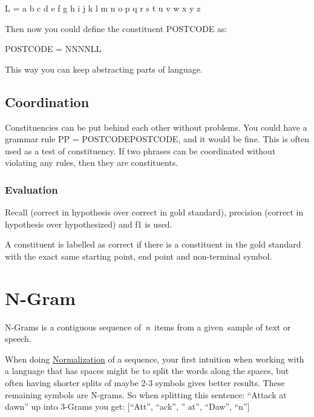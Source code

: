 \documentclass[
  11pt,
  british,
]{article}
\begin{document}
L = a \textbar{} b \textbar{} c \textbar{} d \textbar{} e \textbar{} f
\textbar{} g \textbar{} h \textbar{} i \textbar{} j \textbar{} k
\textbar{} l \textbar{} m \textbar{} n \textbar{} o \textbar{} p
\textbar{} q \textbar{} r \textbar{} s \textbar{} t \textbar{} u
\textbar{} v \textbar{} w \textbar{} x \textbar{} y \textbar{} z

Then now you could define the constituent POSTCODE as:

POSTCODE = NNNNLL

This way you can keep abstracting parts of language.

\hypertarget{coordination}{%
\subsection{Coordination}\label{coordination}}

Constituencies can be put behind each other without problems. You could
have a grammar rule PP = POSTCODEPOSTCODE, and it would be fine. This is
often used as a test of constituency. If two phrases can be coordinated
without violating any rules, then they are constituents.

\hypertarget{evaluation-2}{%
\subsubsection{Evaluation}\label{evaluation-2}}

Recall (correct in hypothesis over correct in gold standard), precision
(correct in hypothesis over hypothesized) and f1 is used.

A constituent is labelled as correct if there is a constituent in the
gold standard with the exact same starting point, end point and
non-terminal symbol.

\hypertarget{n-gram}{%
\section{N-Gram}\label{n-gram}}

N-Grams is a contiguous sequence of~\emph{n}~items from a given~sample
of text or speech.

When doing \href{../Data/Normalization.md}{Normalization} of a sequence,
your first intuition when working with a language that has spaces might
be to split the words along the spaces, but often having shorter splits
of maybe 2-3 symbols gives better results. These remaining symbols are
N-grams. So when splitting this sentence: ``Attack at dawn'' up into
3-Grams you get: {[}``Att'', ``ack'', '' at'', ``Daw'', ``n''{]}
\end{document}
